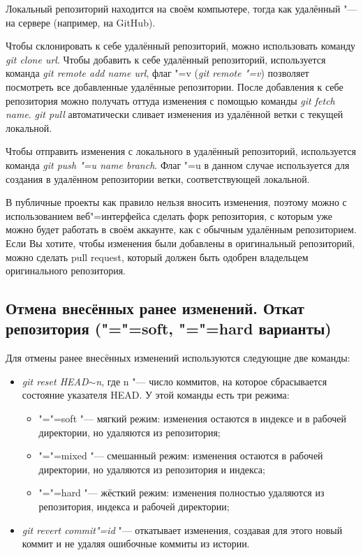 \documentclass[12pt]{article}
\begin{document}
Локальный репозиторий находится на своём компьютере, тогда как удалённый "--- на сервере (например, на GitHub).

Чтобы склонировать к себе удалённый репозиторий, можно использовать команду \textit{git clone url}. Чтобы добавить к себе удалённый репозиторий, используется команда \textit{git remote add name url}, флаг "=v (\textit{git remote "=v}) позволяет посмотреть все добавленные удалённые репозитории. После добавления к себе репозитория можно получать оттуда изменения с помощью команды \textit{git fetch name}. \textit{git pull} автоматически сливает изменения из удалённой ветки с текущей локальной.

Чтобы отправить изменения с локального в удалённый репозиторий, используется команда \textit{git push "=u name branch}. Флаг "=u в данном случае используется для создания в удалённом репозитории ветки, соответствующей локальной.

В публичные проекты как правило нельзя вносить изменения, поэтому можно с использованием веб"=интерфейса сделать форк репозитория, с которым уже можно будет работать в своём аккаунте, как с обычным удалённым репозиторием. Если Вы хотите, чтобы изменения были добавлены в оригинальный репозиторий, можно сделать pull request, который должен быть одобрен владельцем оригинального репозитория.

\subsection{Отмена внесённых ранее изменений. Откат репозитория ("="=soft, "="=hard варианты)}
Для отмены ранее внесённых изменений используются следующие две команды:
\begin{itemize}
\item \textit{git reset HEAD$\sim$n}, где n "--- число коммитов, на которое сбрасывается состояние указателя HEAD. У этой команды есть три режима:
	\begin{itemize}
	\item "="=soft "--- мягкий режим: изменения остаются в индексе и в рабочей директории, но удаляются из репозитория;
	\item "="=mixed "--- смешанный режим: изменения остаются в рабочей директории, но удаляются из репозитория и индекса;
	\item "="=hard "--- жёсткий режим: изменения полностью удаляются из репозитория, индекса и рабочей директории;
	\end{itemize}
\item \textit{git revert commit"=id} "--- откатывает изменения, создавая для этого новый коммит и не удаляя ошибочные коммиты из истории.
\end{itemize}
\end{document}
